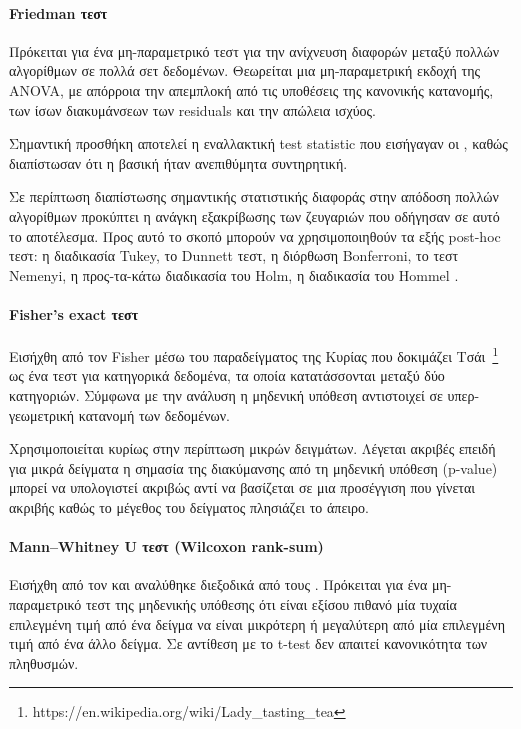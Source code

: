 \paragraph{Friedman τεστ}
Πρόκειται για ένα μη-παραμετρικό τεστ για την ανίχνευση διαφορών μεταξύ πολλών αλγορίθμων σε πολλά σετ δεδομένων. Θεωρείται μια μη-παραμετρική εκδοχή της ANOVA, με απόρροια την απεμπλοκή από τις υποθέσεις της κανονικής κατανομής, των ίσων διακυμάνσεων των residuals και την απώλεια ισχύος.  

Σημαντική προσθήκη αποτελεί η εναλλακτική test statistic που εισήγαγαν οι \citet{doi:10.1080/03610928008827904}, καθώς διαπίστωσαν ότι η βασική ήταν ανεπιθύμητα συντηρητική. 

Σε περίπτωση διαπίστωσης σημαντικής στατιστικής διαφοράς στην απόδοση πολλών αλγορίθμων προκύπτει η ανάγκη εξακρίβωσης των ζευγαριών που οδήγησαν σε αυτό το αποτέλεσμα. Προς αυτό το σκοπό μπορούν να χρησιμοποιηθούν τα εξής post-hoc τεστ: η διαδικασία Tukey, το Dunnett τεστ, η διόρθωση Bonferroni, το τεστ Nemenyi, η προς-τα-κάτω διαδικασία του Holm, η διαδικασία του Hommel \citep{CIS-57999, citeulike:4294367, doi:10.1093/biomet/75.2.383}.
\paragraph{Fisher's exact τεστ}
 Εισήχθη από τον Fisher μέσω του παραδείγματος της Κυρίας που δοκιμάζει Τσάι~\footnote{https://en.wikipedia.org/wiki/Lady\_tasting\_tea} ως ένα τεστ για κατηγορικά δεδομένα, τα οποία κατατάσσονται μεταξύ δύο κατηγοριών. Σύμφωνα με την ανάλυση η μηδενική υπόθεση αντιστοιχεί σε υπερ-γεωμετρική κατανομή των δεδομένων.
  
 Χρησιμοποιείται κυρίως στην περίπτωση μικρών δειγμάτων. Λέγεται ακριβές επειδή για μικρά δείγματα η σημασία της διακύμανσης από τη μηδενική υπόθεση (p-value) μπορεί να υπολογιστεί ακριβώς αντί να βασίζεται σε μια προσέγγιση που γίνεται ακριβής καθώς το μέγεθος του δείγματος πλησιάζει το άπειρο.
\paragraph{Mann–Whitney U τεστ (Wilcoxon rank-sum)} Εισήχθη από τον \citet{Wilcoxon45} και αναλύθηκε διεξοδικά από τους \citet{mann1947}. Πρόκειται για ένα μη-παραμετρικό τεστ της μηδενικής υπόθεσης ότι είναι εξίσου πιθανό μία τυχαία επιλεγμένη τιμή από ένα δείγμα να είναι μικρότερη ή μεγαλύτερη από μία επιλεγμένη τιμή από ένα άλλο δείγμα. Σε αντίθεση με το t-test δεν απαιτεί κανονικότητα των πληθυσμών.
 
